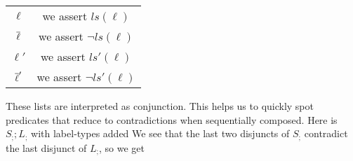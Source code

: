 \begin{tabular}{|c|c|}
  \hline
  $\ell$ & we assert $ls(\ell)$ \\
  $\overline{\ell}$ & we assert $\lnot ls(\ell)$ \\
  $\ell'$ & we assert $ls'(\ell)$ \\
  $\overline{\ell}'$ & we assert $\lnot ls'(\ell)$ \\
  \hline
\end{tabular}

These lists are interpreted as conjunction.
This helps us to quickly spot predicates that reduce to
contradictions when sequentially composed.
Here is $S_; ; L_;$ with label-types added
We see that the last two disjuncts of $S_;$ contradict the last disjunct
of $L_;$, so we get
